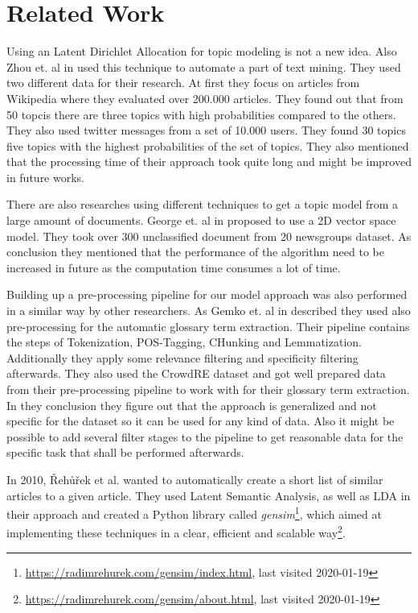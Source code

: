 \section{Related Work} %
\label{sec:related_work}

Using an Latent Dirichlet Allocation for topic modeling is not a new idea. Also Zhou et. al in \cite{zhou_tong_text_2016} used this technique to automate a part of text mining. They used two different data for their research. At first they focus on articles from Wikipedia where they evaluated over 200.000 articles. They found out that from 50 topcis there are three topics with high probabilities compared to the others. They also used twitter messages from a set of 10.000 users. They found 30 topics five topics with the highest probabilities of the set of topics. They also mentioned that the processing time of their approach took quite long and might be improved in future works.


There are also researches using different techniques to get a topic model from a large amount of documents. George et. al in \cite{george_unsupervised_2018} proposed to use a 2D vector space model. They took over 300 unclassified document from 20 newsgroups dataset. As conclusion they mentioned that the performance of the algorithm need to be increased in future as the computation time consumes a lot of time.


Building up a pre-processing pipeline for our model approach was also performed in a similar way by other researchers. As Gemko et. al in \cite{gemkow_automatic_2018} described they used also pre-processing for the automatic glossary term extraction. Their pipeline contains the steps of Tokenization, POS-Tagging, CHunking and Lemmatization. Additionally they apply some relevance filtering and specificity filtering afterwards. They also used the CrowdRE dataset and got well prepared data from their pre-processing pipeline to work with for their glossary term extraction. In they conclusion they figure out that the approach is generalized and not specific for the dataset so it can be used for any kind of data. Also it might be possible to add several filter stages to the pipeline to get reasonable data for the specific task that shall be performed afterwards.


In 2010, {\v R}eh{\r u}{\v r}ek et al. wanted to automatically create a short list of similar articles to a given article\cite{rehurek_software_2010}. They used Latent Semantic Analysis, as well as LDA in their approach and created a Python library called \emph{gensim}\footnote{\url{https://radimrehurek.com/gensim/index.html}, last visited 2020-01-19\label{fn:gensim_website}}, which aimed at implementing these techniques in a clear, efficient and scalable way\footnote{\url{https://radimrehurek.com/gensim/about.html}, last visited 2020-01-19}.